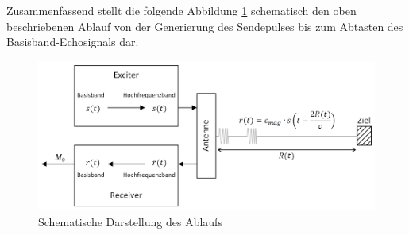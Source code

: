 Zusammenfassend stellt die folgende Abbildung \ref{fig:ZusFas} schematisch den oben beschriebenen Ablauf von der Generierung des Sendepulses bis zum Abtasten des Basisband-Echosignals dar. 
%
\begin{figure}[H] 
  \centering
     \includegraphics[scale=0.4]{images/Signals_Exciter_Receiver_Zoom240.PNG}
  \caption{Schematische Darstellung des Ablaufs}
  \label{fig:ZusFas}
\end{figure} 
%